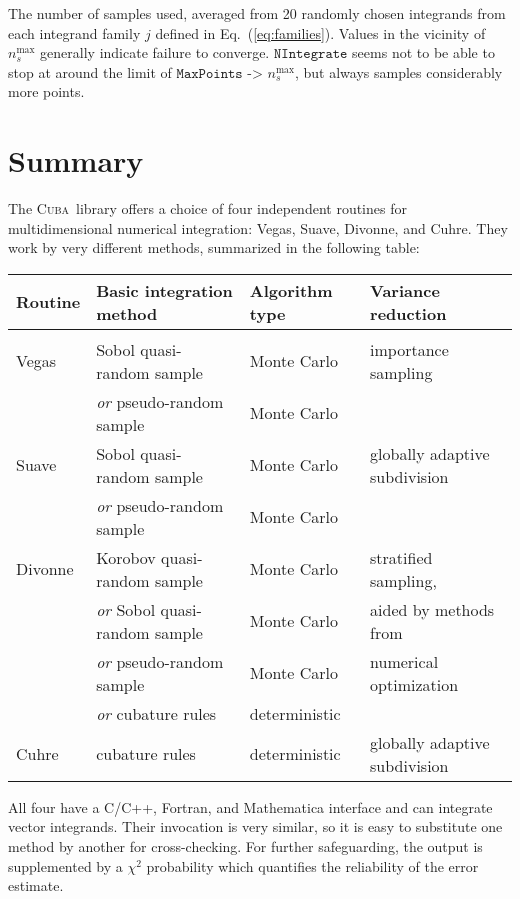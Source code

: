 \documentclass[12pt]{article}
\newcommand\cuba{\textsc{Cuba}}
\newcommand\nmax{n_s^{\text{max}}}
\newcommand\Code[1]{\ensuremath{\texttt{#1}}}
\begin{document}
\begin{table}
\caption{\label{tab:comp}The number of samples used, averaged from 20
randomly chosen integrands from each integrand family $j$ defined in
Eq.~(\ref{eq:families}).  Values in the vicinity of $\nmax$ generally
indicate failure to converge. \Code{NIntegrate} seems not to be able
to stop at around the limit of \Code{MaxPoints -> $\nmax$}, but always
samples considerably more points.}
\end{table}



\section{Summary}

The \cuba\ library offers a choice of four independent routines for
multidimensional numerical integration: Vegas, Suave, Divonne, and
Cuhre.  They work by very different methods, summarized in the following
table:
\begin{center}
\begin{small}
\begin{tabular}{llll}
Routine  &
	Basic integration method &
	Algorithm type &
	Variance reduction \\ \hline \\[-1.5ex]
Vegas &
	Sobol quasi-random sample &
	Monte Carlo &
	importance sampling \\
&
	\textit{or} pseudo-random sample &
	Monte Carlo \\[1.5ex]
Suave &
	Sobol quasi-random sample &
	Monte Carlo &
	globally adaptive subdivision \\
&
	\textit{or} pseudo-random sample &
	Monte Carlo \\[1.5ex]
Divonne &
	Korobov quasi-random sample &
	Monte Carlo &
	stratified sampling, \\
&
	\textit{or} Sobol quasi-random sample &
	Monte Carlo &
	\quad aided by methods from \\
&
	\textit{or} pseudo-random sample &
	Monte Carlo &
	\quad numerical optimization \\
&
	\textit{or} cubature rules &
	deterministic \\[1.5ex]
Cuhre &
	cubature rules &
	deterministic &
	globally adaptive subdivision
\end{tabular}
\end{small}
\end{center}

All four have a C/C++, Fortran, and Mathematica interface and can
integrate vector integrands.  Their invocation is very similar, so it is
easy to substitute one method by another for cross-checking.  For
further safeguarding, the output is supplemented by a $\chi^2$
probability which quantifies the reliability of the error estimate.
\end{document}
